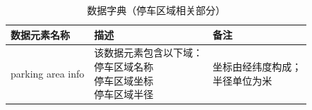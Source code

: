 \begin{table}
\centering
\caption{数据字典（停车区域相关部分）}
\label{DataDictionary2}
\begin{tabular}{lll}\toprule
  数据元素名称&描述&备注\\\midrule
parking area info          &   \makecell[l]{
    该数据元素包含以下域：\\
    \quad 停车区域名称\\
    \quad 停车区域坐标\\
    \quad 停车区域半径\\
    }                &\makecell[l]{坐标由经纬度构成；\\半径单位为米}             \\
 \bottomrule
\end{tabular}
\end{table}

